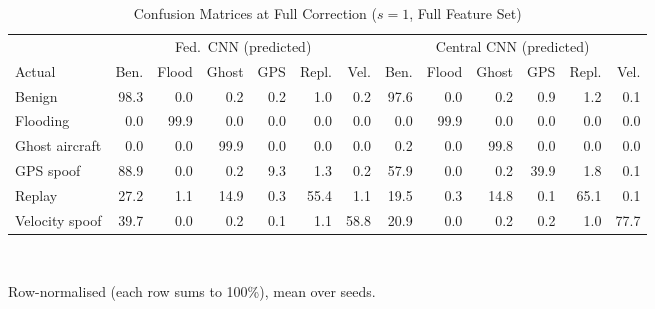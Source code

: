 \begin{table}[t]
\centering
\scriptsize
\caption{Confusion Matrices at Full Correction ($s=1$, Full Feature Set)}
\label{tab:confusion}
\setlength{\tabcolsep}{2.5pt}
\begin{tabular}{lrrrrrrrrrrrr}
\toprule
& \multicolumn{6}{c}{Fed.\ CNN (predicted)} & \multicolumn{6}{c}{Central CNN (predicted)} \\
\cmidrule(lr){2-7}\cmidrule(lr){8-13}
Actual & Ben. & Flood & Ghost & GPS & Repl. & Vel. & Ben. & Flood & Ghost & GPS & Repl. & Vel. \\
\midrule
Benign & 98.3 & 0.0 & 0.2 & 0.2 & 1.0 & 0.2 & 97.6 & 0.0 & 0.2 & 0.9 & 1.2 & 0.1 \\
Flooding & 0.0 & 99.9 & 0.0 & 0.0 & 0.0 & 0.0 & 0.0 & 99.9 & 0.0 & 0.0 & 0.0 & 0.0 \\
Ghost aircraft & 0.0 & 0.0 & 99.9 & 0.0 & 0.0 & 0.0 & 0.2 & 0.0 & 99.8 & 0.0 & 0.0 & 0.0 \\
GPS spoof & 88.9 & 0.0 & 0.2 & 9.3 & 1.3 & 0.2 & 57.9 & 0.0 & 0.2 & 39.9 & 1.8 & 0.1 \\
Replay & 27.2 & 1.1 & 14.9 & 0.3 & 55.4 & 1.1 & 19.5 & 0.3 & 14.8 & 0.1 & 65.1 & 0.1 \\
Velocity spoof & 39.7 & 0.0 & 0.2 & 0.1 & 1.1 & 58.8 & 20.9 & 0.0 & 0.2 & 0.2 & 1.0 & 77.7 \\
\bottomrule
\end{tabular}
\\[2pt]
\parbox{\linewidth}{\scriptsize Row-normalised (each row sums to 100\%), mean over  seeds.}
\end{table}

